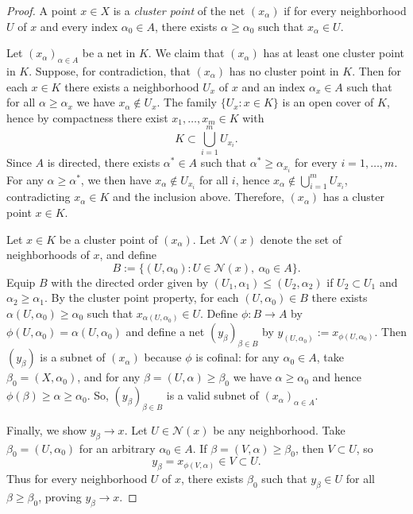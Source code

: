 \documentclass[12pt]{article}
\renewcommand{\(}{\left(}%
\renewcommand{\)}{\right)}%
\renewcommand{\[}{\left[}%
\renewcommand{\]}{\right]}%
\newtheorem{proof}{Proof.}}
\begin{document}
\begin{proof}
	A point $x\in X$ is a \emph{cluster point} of the net $(x_\alpha)$ if for every neighborhood $U$ of $x$ and every index $\alpha_0\in A$, there exists $\alpha\ge \alpha_0$ such that $x_\alpha\in U$. 
	
	Let $(x_\alpha)_{\alpha\in A}$ be a net in $K$. We claim that $(x_\alpha)$ has at least one cluster point in $K$.
Suppose, for contradiction, that $(x_\alpha)$ has no cluster point in $K$.
Then for each $x\in K$ there exists a neighborhood $U_x$ of $x$ and an index $\alpha_x\in A$ such that for all $\alpha\ge \alpha_x$ we have $x_\alpha\notin U_x$.
The family $\{U_x:x\in K\}$ is an open cover of $K$, hence by compactness there exist $x_1,\dots,x_m\in K$ with
\begin{equation}
K\subset \bigcup_{i=1}^m U_{x_i}.
\end{equation}
Since $A$ is directed, there exists $\alpha^\ast\in A$ such that $\alpha^\ast\ge \alpha_{x_i}$ for every $i=1,\dots,m$.
For any $\alpha\ge \alpha^\ast$, we then have $x_\alpha\notin U_{x_i}$ for all $i$, hence $x_\alpha\notin \bigcup_{i=1}^m U_{x_i}$, contradicting $x_\alpha\in K$ and the inclusion above.
Therefore, $(x_\alpha)$ has a cluster point $x\in K$.

Let $x\in K$ be a cluster point of $(x_\alpha)$.
Let $\mathcal N(x)$ denote the set of neighborhoods of $x$, and define
\begin{equation}
B:=\{(U,\alpha_0):U\in\mathcal N(x),\ \alpha_0\in A\}.
\end{equation}
Equip $B$ with the directed order given by $(U_1,\alpha_1)\le (U_2,\alpha_2)$ if $U_2\subset U_1$ and $\alpha_2\ge \alpha_1$.
By the cluster point property, for each $(U,\alpha_0)\in B$ there exists $\alpha(U,\alpha_0)\ge \alpha_0$ such that $x_{\alpha(U,\alpha_0)}\in U$.
Define $\phi:B\to A$ by $\phi(U,\alpha_0)=\alpha(U,\alpha_0)$ and define a net $(y_\beta)_{\beta\in B}$ by $y_{(U,\alpha_0)}:=x_{\phi(U,\alpha_0)}$.
Then $(y_\beta)$ is a subnet of $(x_\alpha)$ because $\phi$ is cofinal: for any $\alpha_0\in A$, take $\beta_0=(X,\alpha_0)$, and for any $\beta=(U,\alpha)\ge \beta_0$ we have $\alpha\ge \alpha_0$ and hence $\phi(\beta)\ge \alpha\ge \alpha_0$. So, $(y_\beta)_{\beta\in B}$ is a valid subnet of $(x_\alpha)_{\alpha\in A}$.

Finally, we show $y_\beta\to x$.
Let $U\in\mathcal N(x)$ be any neighborhood. Take $\beta_0=(U,\alpha_0)$ for an arbitrary $\alpha_0\in A$.
If $\beta=(V,\alpha)\ge \beta_0$, then $V\subset U$, so
\begin{equation}
y_\beta=x_{\phi(V,\alpha)}\in V\subset U.
\end{equation}
Thus for every neighborhood $U$ of $x$, there exists $\beta_0$ such that $y_\beta\in U$ for all $\beta\ge \beta_0$, proving $y_\beta\to x$.
\end{proof}
\end{document}
